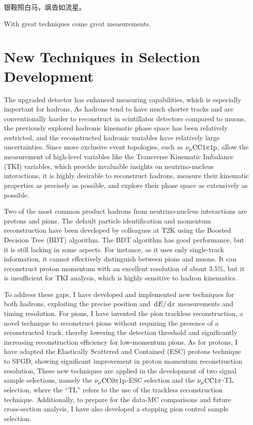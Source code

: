 \begin{savequote}[8cm]
\begin{CJK*}{UTF8}{gbsn}
  银鞍照白马，飒沓如流星。
\end{CJK*}

With great techniques come great measurements.

\end{savequote}

\chapter{\label{ch:techniques}New Techniques in Selection Development} 
\minitoc

The upgraded detector has enhanced measuring capabilities, which is especially important for hadrons,
As hadrons tend to have much shorter tracks and are conventionally harder to reconstruct in scintillator detectors compared to muons, the previously explored hadronic kinematic phase space has been relatively restricted, and the reconstructed hadronic variables have relatively large uncertainties.
Since more exclusive event topologies, such as $\nu_{\mu}\textrm{CC}1\pi1\textrm{p}$, allow the measurement of high-level variables like the Transverse Kinematic Imbalance (TKI) variables, which provide invaluable insights on neutrino-nucleus interactions, it is highly desirable to reconstruct hadrons, measure their kinematic properties as precisely as possible, and explore their phase space as extensively as possible.

Two of the most common product hadrons from neutrino-nucleus interactions are protons and pions. 
The default particle identification and momentum reconstruction have been developed by colleagues at T2K using the Boosted Decision Tree (BDT) algorithm. The BDT algorithm has good performance, but it is still lacking in some aspects.
For instance, as it uses only single-track information, it cannot effectively distinguish between pions and muons. 
It can reconstruct proton momentum with an excellent resolution of about $3.5\%$, but it is insufficient for TKI analysis, which is highly sensitive to hadron kinematics. 

To address these gaps, I have developed and implemented new techniques for both hadrons, exploiting the precise position and $\,\textrm{d}E/\,\textrm{d}x$ measurements and timing resolution.
For pions, I have invented the pion trackless reconstruction, a novel technique to reconstruct pions without requiring the presence of a reconstructed track, thereby lowering the detection threshold and significantly increasing reconstruction efficiency for low-momentum pions. 
As for protons, I have adapted the Elastically Scattered and Contained (ESC) protons technique~\cite{Lu:2016mjf} to SFGD, showing significant improvement in proton momentum reconstruction resolution,  
These new techniques are applied in the development of two signal sample selections, namely the $\nu_{\mu}\textrm{CC}0\pi1\textrm{p}$-ESC selection and the $\nu_{\mu}\textrm{CC}1\pi$-TL selection, where the ``TL'' refers to the use of the trackless reconstruction technique.
Additionally, to prepare for the data-MC comparisons and future cross-section analysis, I have also developed a stopping pion control sample selection.

